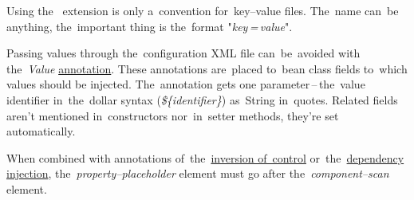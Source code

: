 
\notenonl Using the~ extension is only a~convention for~key--value files. The~name can~be anything, the~important thing is the~format "\textit{key\,=\,value}".
\newpage

\label{readingpropertiesannotations}
Passing values through the~configuration XML file can~be~avoided with the~\textit{Value} \hyperref[javaannotation]{annotation}. These annotations are~placed to~bean class fields to~which values should be injected. The~annotation gets one parameter\,--\,the~value identifier in~the~dollar syntax (\textit{\$\{identifier\}}) as~String in~quotes. Related fields aren't mentioned in~constructors nor~in~setter methods, they're set automatically.

\warning When combined with annotations of~the~\hyperref[iocannotations]{inversion of~control} or~the~\hyperref[autowiring]{dependency injection}, the~\textit{property--placeholder} element must go after the~\textit{component--scan} element.


